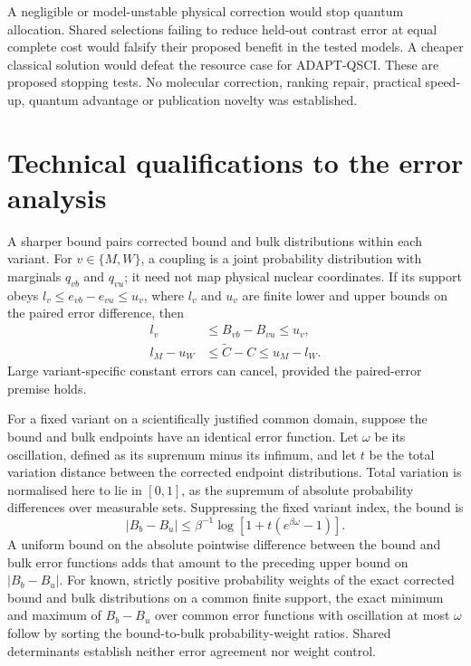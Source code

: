 \documentclass{article}
\begin{document}
A negligible or model-unstable physical correction would stop quantum allocation. Shared selections failing to reduce held-out contrast error at equal complete cost would falsify their proposed benefit in the tested models. A cheaper classical solution would defeat the resource case for ADAPT-QSCI. These are proposed stopping tests. No molecular correction, ranking repair, practical speed-up, quantum advantage or publication novelty was established.

\section{Technical qualifications to the error analysis}

A sharper bound pairs corrected bound and bulk distributions within each variant. For \(v\in\{M,W\}\), a coupling is a joint probability distribution with marginals \(q_{vb}\) and \(q_{vu}\); it need not map physical nuclear coordinates. If its support obeys
\(l_v\leq e_{vb}-e_{vu}\leq u_v\), where \(l_v\) and \(u_v\) are finite lower and upper bounds on the paired error difference, then
\[
\begin{aligned}
l_v&\leq B_{vb}-B_{vu}\leq u_v,\\
l_M-u_W&\leq\widetilde C-C\leq u_M-l_W.
\end{aligned}
\]
Large variant-specific constant errors can cancel, provided the paired-error premise holds.

For a fixed variant on a scientifically justified common domain, suppose the bound and bulk endpoints have an identical error function. Let \(\omega\) be its oscillation, defined as its supremum minus its infimum, and let \(t\) be the total variation distance between the corrected endpoint distributions. Total variation is normalised here to lie in \([0,1]\), as the supremum of absolute probability differences over measurable sets. Suppressing the fixed variant index, the bound is
\[
|B_b-B_u|\leq\beta^{-1}\log[1+t(e^{\beta\omega}-1)].
\]
A uniform bound on the absolute pointwise difference between the bound and bulk error functions adds that amount to the preceding upper bound on \(|B_b-B_u|\). For known, strictly positive probability weights of the exact corrected bound and bulk distributions on a common finite support, the exact minimum and maximum of \(B_b-B_u\) over common error functions with oscillation at most \(\omega\) follow by sorting the bound-to-bulk probability-weight ratios. Shared determinants establish neither error agreement nor weight control.
\end{document}
